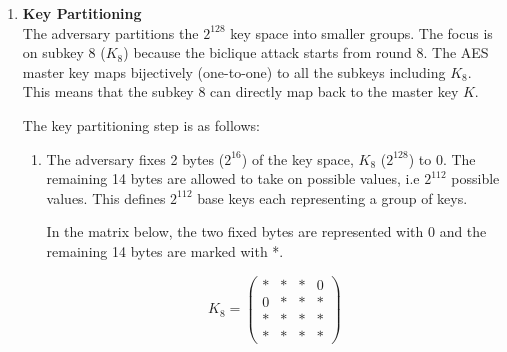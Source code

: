 \documentclass{report}
\begin{document}
 \begin{enumerate}[start = 1, label={(\bfseries Step\arabic*):}]
    \item \textbf{Key Partitioning\cite{bogdanov2011biclique}} \\ The adversary partitions the $2^{128}$ key space into smaller groups. The focus is on subkey 8 ($K_8$) because the biclique attack starts from round 8. The AES master key maps bijectively (one-to-one) to all the subkeys including $K_8$. This means that the subkey 8 can directly map back to the master key $K$.

    The key partitioning step is as follows:
    
    \begin{enumerate}
        \item The adversary fixes 2 bytes ($2^{16}$) of the key space, $K_8$ ($2^{128}$) to 0. The remaining 14 bytes are allowed to take on possible values, i.e $2^{112}$ possible values. This defines $2^{112}$ base keys each representing a group of keys.
    
        In the matrix below, the two fixed bytes are represented with 0 and the remaining 14 bytes are marked with *.
    
        \[
        K_8 = \begin{pmatrix}
        * & * & * & 0 \\
        0 & * & * & * \\
        * & * & * & * \\
        * & * & * & *
        \end{pmatrix}
        \]
    

\end{enumerate}
\end{enumerate}
\end{document}
